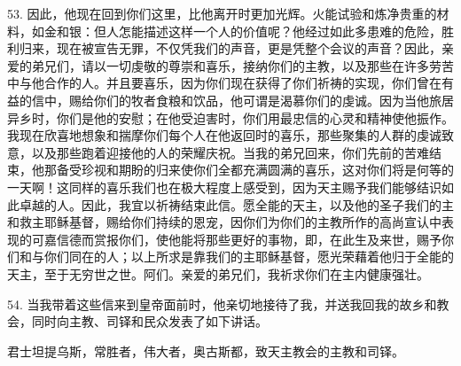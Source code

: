 53. 因此，他现在回到你们这里，比他离开时更加光辉。火能试验和炼净贵重的材料，如金和银：但人怎能描述这样一个人的价值呢？他经过如此多患难的危险，胜利归来，现在被宣告无罪，不仅凭我们的声音，更是凭整个会议的声音？因此，亲爱的弟兄们，请以一切虔敬的尊崇和喜乐，接纳你们的主教，以及那些在许多劳苦中与他合作的人。并且要喜乐，因为你们现在获得了你们祈祷的实现，你们曾在有益的信中，赐给你们的牧者食粮和饮品，他可谓是渴慕你们的虔诚。因为当他旅居异乡时，你们是他的安慰；在他受迫害时，你们用最忠信的心灵和精神使他振作。我现在欣喜地想象和揣摩你们每个人在他返回时的喜乐，那些聚集的人群的虔诚致意，以及那些跑着迎接他的人的荣耀庆祝。当我的弟兄回来，你们先前的苦难结束，他那备受珍视和期盼的归来使你们全都充满圆满的喜乐，这对你们将是何等的一天啊！这同样的喜乐我们也在极大程度上感受到，因为天主赐予我们能够结识如此卓越的人。因此，我宜以祈祷结束此信。愿全能的天主，以及他的圣子我们的主和救主耶稣基督，赐给你们持续的恩宠，因你们为你们的主教所作的高尚宣认中表现的可嘉信德而赏报你们，使他能将那些更好的事物，即，在此生及来世，赐予你们和与你们同在的人；以上所求是靠我们的主耶稣基督，愿光荣藉着他归于全能的天主，至于无穷世之世。阿们。亲爱的弟兄们，我祈求你们在主内健康强壮。\par

54. 当我带着这些信来到皇帝面前时，他亲切地接待了我，并送我回我的故乡和教会，同时向主教、司铎和民众发表了如下讲话。\par

君士坦提乌斯，常胜者，伟大者，奥古斯都，致天主教会的主教和司铎。\par

\par

